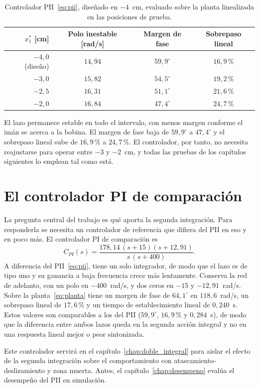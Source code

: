 \begin{table}[ht]
    \centering
    \caption[PII en el intervalo de operación]{Controlador PII~\eqref{eq:pii}, diseñado en $-4$~cm, evaluado sobre la planta linealizada en las posiciones de prueba.}
    \label{tab:pii_intervalo}
    \begin{tabular}{rccc}
        \hline
        $x_1^*$ [cm] & Polo inestable [rad/s] & Margen de fase & Sobrepaso lineal \\
        \hline
        $-4{,}0$ (diseño) & $14{,}94$ & $59{,}9^\circ$ & $16{,}9$\,\% \\
        $-3{,}0$ & $15{,}82$ & $54{,}5^\circ$ & $19{,}2$\,\% \\
        $-2{,}5$ & $16{,}31$ & $51{,}1^\circ$ & $21{,}6$\,\% \\
        $-2{,}0$ & $16{,}84$ & $47{,}4^\circ$ & $24{,}7$\,\% \\
        \hline
    \end{tabular}
\end{table}

El lazo permanece estable en todo el intervalo, con menos margen conforme el imán se acerca a la bobina. El margen de fase baja de $59{,}9^\circ$ a $47{,}4^\circ$ y el sobrepaso lineal sube de $16{,}9$\,\% a $24{,}7$\,\%. El controlador, por tanto, no necesita reajustarse para operar entre $-3$ y $-2$~cm, y todas las pruebas de los capítulos siguientes lo emplean tal como está.

\section{El controlador PI de comparación}\label{sec:pi}

La pregunta central del trabajo es qué aporta la segunda integración. Para responderla se necesita un controlador de referencia que difiera del PII en eso y en poco más. El controlador PI de comparación es
\begin{equation}
C_{PI}(s)=\frac{178{,}14\,(s+15)(s+12{,}91)}{s\,(s+400)} .
\label{eq:pi}
\end{equation}
A diferencia del PII~\eqref{eq:pii}, tiene un solo integrador, de modo que el lazo es de tipo uno y su ganancia a baja frecuencia crece más lentamente. Conserva la red de adelanto, con un polo en $-400$~rad/s, y dos ceros en $-15$ y $-12{,}91$~rad/s. Sobre la planta~\eqref{eq:planta} tiene un margen de fase de $64{,}1^\circ$ en $118{,}6$~rad/s, un sobrepaso lineal de $17{,}6$\,\% y un tiempo de establecimiento lineal de $0{,}240$~s. Estos valores son comparables a los del PII ($59{,}9^\circ$, $16{,}9$\,\% y $0{,}284$~s), de modo que la diferencia entre ambos lazos queda en la segunda acción integral y no en una respuesta lineal mejor o peor sintonizada.

Este controlador servirá en el capítulo~\ref{chap:doble_integral} para aislar el efecto de la segunda integración sobre el comportamiento con atascamiento-deslizamiento y zona muerta. Antes, el capítulo~\ref{chap:desempeno} evalúa el desempeño del PII en simulación.
